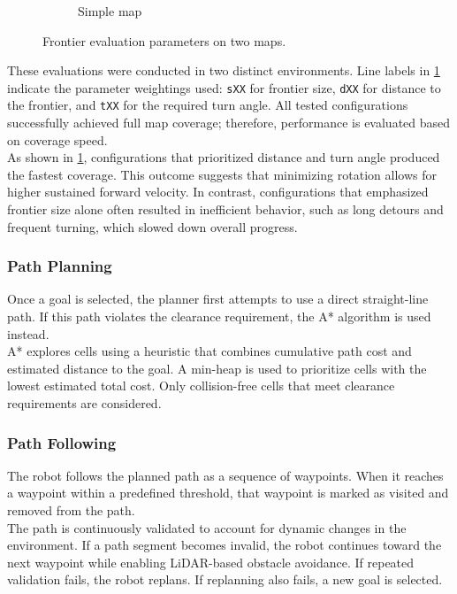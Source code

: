\begin{figure}[H]
\begin{subfigure}[b]{0.45\textwidth}
        \caption{Simple map}
    \end{subfigure}
    \caption{Frontier evaluation parameters on two maps.}
    \label{fig:frontier-eval-params}
\end{figure}

These evaluations were conducted in two distinct environments. Line labels in \cref{fig:frontier-eval-params} indicate the parameter weightings used: \texttt{sXX} for frontier size, \texttt{dXX} for distance to the frontier, and \texttt{tXX} for the required turn angle. All tested configurations successfully achieved full map coverage; therefore, performance is evaluated based on coverage speed. \\

As shown in \cref{fig:frontier-eval-params}, configurations that prioritized distance and turn angle produced the fastest coverage. This outcome suggests that minimizing rotation allows for higher sustained forward velocity. In contrast, configurations that emphasized frontier size alone often resulted in inefficient behavior, such as long detours and frequent turning, which slowed down overall progress.

\subsubsection{Path Planning}
\label{sec:path_planning}
Once a goal is selected, the planner first attempts to use a direct straight-line path. If this path violates the clearance requirement, the A* algorithm is used instead. \\

A* explores cells using a heuristic that combines cumulative path cost and estimated distance to the goal. A min-heap is used to prioritize cells with the lowest estimated total cost. Only collision-free cells that meet clearance requirements are considered.

\subsubsection{Path Following}
\label{sec:path_following}
The robot follows the planned path as a sequence of waypoints. When it reaches a waypoint within a predefined threshold, that waypoint is marked as visited and removed from the path. \\

The path is continuously validated to account for dynamic changes in the environment. If a path segment becomes invalid, the robot continues toward the next waypoint while enabling LiDAR-based obstacle avoidance. If repeated validation fails, the robot replans. If replanning also fails, a new goal is selected. \\

